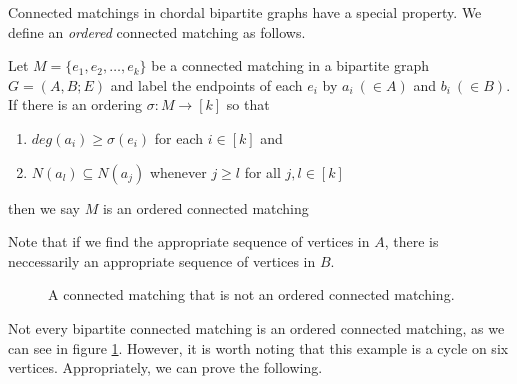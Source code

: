 Connected matchings in chordal bipartite graphs have a special property.
%
We define an {\it ordered} connected matching as follows.
%  
\begin{mydef}
	Let $M = \{e_1, e_2, \ldots, e_k\}$ be a connected matching in a bipartite graph $G = (A,B; E)$ and label the endpoints of each $e_i$ by $a_i \: (\in A)$ and $b_i \: (\in B)$.  If there is an ordering $\sigma : M \rightarrow [k]$ so that 
	\begin{enumerate}
		\item $deg(a_i) \geq \sigma(e_i)$ for each $i\in [k]$ and 
		\item $N(a_l) \subseteq N(a_j)$ whenever $j \geq l$ for all $j,l \in [k]$
	\end{enumerate} 
then we say $M$ is an ordered connected matching
\end{mydef}
%
Note that if we find the appropriate sequence of vertices in $A$, there is neccessarily an appropriate sequence of vertices in $B$.  
%
\begin{figure}
	\begin{center}
	
	\end{center}
	\label{c_6}
	\caption{A connected matching that is not an ordered connected matching.}
\end{figure}
%
Not every bipartite connected matching is an ordered connected matching, as we can see in figure \ref{c_6}. 
%
 However, it is worth noting that this example is a cycle on six vertices.  
%
Appropriately, we can prove the following.
%
